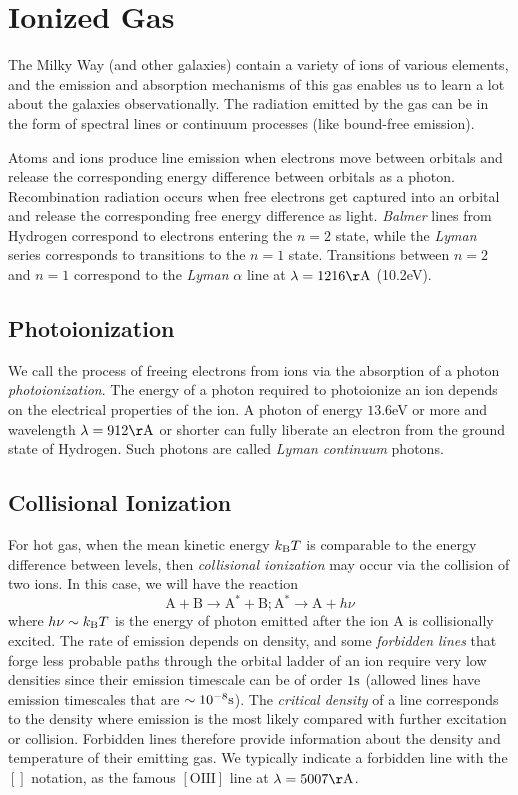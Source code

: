 \documentclass[12pt]{article}
\begin{document}
\section{Ionized Gas}

The Milky Way (and other galaxies) contain a variety of ions of various elements,
and the emission and absorption mechanisms of this gas enables us to learn a lot
about the galaxies observationally. The radiation emitted by the gas can be
in the form of spectral lines or continuum processes (like bound-free emission).

Atoms and ions produce line emission when electrons move between orbitals and
release the corresponding energy difference between orbitals as a photon.
Recombination radiation occurs when free electrons get captured into an orbital
and release the corresponding free energy difference as light. {\it Balmer} lines
from Hydrogen correspond to electrons entering the $n=2$ state, while the {\it Lyman}
series corresponds to transitions to the $n=1$ state. Transitions between $n=2$ and
$n=1$ correspond to the {\it Lyman} $\alpha$ line at $\lambda = 1216\Ang$ (10.2eV). 

\subsection{Photoionization}
We call the process of freeing electrons from ions via the absorption of a photon
{\it photoionization}. The energy of a photon required to photoionize an ion depends
on the electrical properties of the ion.
A photon of
energy $13.6$eV or more and wavelength $\lambda=912\Ang$ or shorter can fully liberate
an electron from the ground state of Hydrogen. Such photons are called {\it Lyman continuum}
photons.

\subsection{Collisional Ionization}

For hot gas, when the mean kinetic energy $k_{\mathrm{B}} T$ is comparable to the energy
difference between levels, then {\it collisional ionization} may occur via the
collision of two ions. In this case, we will have the reaction
\begin{equation}
\mathrm{A}+\mathrm{B}\to \mathrm{A}^{*} + \mathrm{B}; \mathrm{A}^{*} \to \mathrm{A} + h\nu
\end{equation}
\noindent
where $h\nu \sim k_{\mathrm{B}} T$ is the energy of photon emitted after the ion A is collisionally
excited. The rate of emission depends on density, and some {\it forbidden lines} that forge 
less probable paths through the orbital ladder of an ion require very low densities since
their emission timescale can be of order $1\mathrm{s}$ (allowed lines have emission timescales that
are $\sim10^{-8}\mathrm{s}$). The {\it critical density} of a line corresponds to the density where
emission is the most likely compared with further excitation or collision. Forbidden lines 
therefore provide information about the density and temperature of their emitting gas. We 
typically indicate a forbidden line with the $[]$ notation, as the famous $[\mathrm{OIII}]$
line at $\lambda=5007\Ang$.
\end{document}
